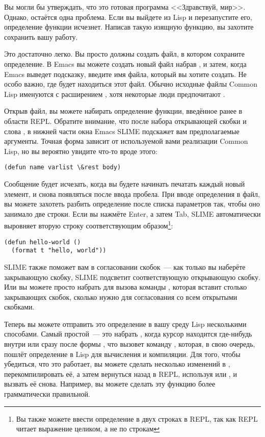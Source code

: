 Вы могли бы утверждать, что это готовая программа <<Здравствуй, мир>>. Однако, остаётся одна
проблема. Если вы выйдете из Lisp и перезапустите его, определение функции
исчезнет. Написав такую изящную функцию, вы захотите сохранить вашу работу.

Это достаточно легко. Вы просто должны создать файл, в котором сохраните определение. В
Emacs вы можете создать новый файл набрав , и затем, когда Emacs выведет подсказку,
введите имя файла, который вы хотите создать. Не особо важно, где будет находиться этот
файл. Обычно исходные файлы Common Lisp именуются с расширением , хотя некоторые люди
предпочитают .

Открыв файл, вы можете набирать определение функции, введённое ранее в области
REPL. Обратите внимание, что после набора открывающей скобки и слова , в нижней части
окна Emacs SLIME подскажет вам предполагаемые аргументы. Точная форма зависит от
используемой вами реализации Common Lisp, но вы вероятно увидите что-то вроде этого:

\begin{lstlisting}
(defun name varlist \&rest body)
\end{lstlisting}

Сообщение будет исчезать, когда вы будете начинать печатать каждый новый элемент, и снова
появляться после ввода пробела. При вводе определения в файл, вы можете захотеть разбить
определение после списка параметров так, чтобы оно занимало две строки. Если вы нажмёте
Enter, а затем Tab, SLIME автоматически выровняет вторую строку соответствующим
образом\footnote{Вы также можете ввести определение в двух строках в REPL, так как REPL
  читает выражение целиком, а не по строкам}:

\begin{lstlisting}
(defun hello-world ()
  (format t "hello, world"))
\end{lstlisting}

SLIME также поможет вам в согласовании скобок~--- как только вы наберёте закрывающую
скобку, SLIME подсветит соответствующую открывающую скобку. Или вы можете просто набрать
 для вызова команды , которая вставит столько
закрывающих скобок, сколько нужно для согласования со всем открытыми скобками.

Теперь вы можете отправить это определение в вашу среду Lisp несколькими способами. Самый
простой~--- это набрать , когда курсор находится где-нибудь внутри или сразу после
формы , что вызовет команду , которая, в свою очередь, пошлёт
определение в Lisp для вычисления и компиляции. Для того, чтобы убедиться, что это
работает, вы можете сделать несколько изменений в , перекомпилировать её, а
затем вернуться назад в REPL, используя  или , и вызвать её снова. Например,
вы можете сделать эту функцию более грамматически правильной.

